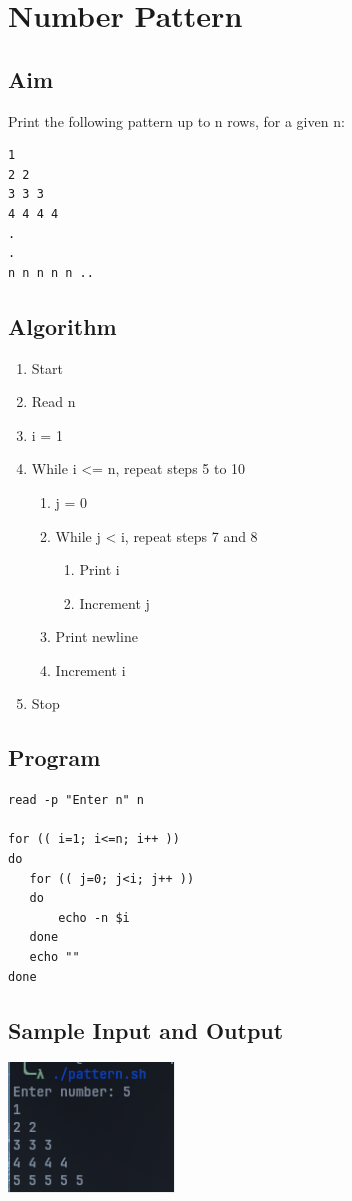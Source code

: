 \section{Number Pattern}

\subsection{Aim}
Print the following pattern up to n rows, for a given n:
\begin{verbatim}
1
2 2
3 3 3
4 4 4 4
.
.
n n n n n ..
\end{verbatim}

\subsection{Algorithm}
\begin{enumerate}
   \item Start
   \item Read n
   \item i = 1
   \item While i <= n, repeat steps 5 to 10
       \begin{enumerate}
           \item j = 0
           \item While j < i, repeat steps 7 and 8
               \begin{enumerate}
                   \item Print i
                   \item Increment j
               \end{enumerate}
           \item Print newline
           \item Increment i
       \end{enumerate}
   \item Stop
\end{enumerate}

\subsection{Program}
\begin{lstlisting}[label={list:program:number_pattern}]
read -p "Enter n" n

for (( i=1; i<=n; i++ ))
do
   for (( j=0; j<i; j++ ))
   do
       echo -n $i
   done
   echo ""
done
\end{lstlisting}

\subsection{Sample Input and Output}
\includegraphics[]{Cycle_1//Outputs/patern.png}


